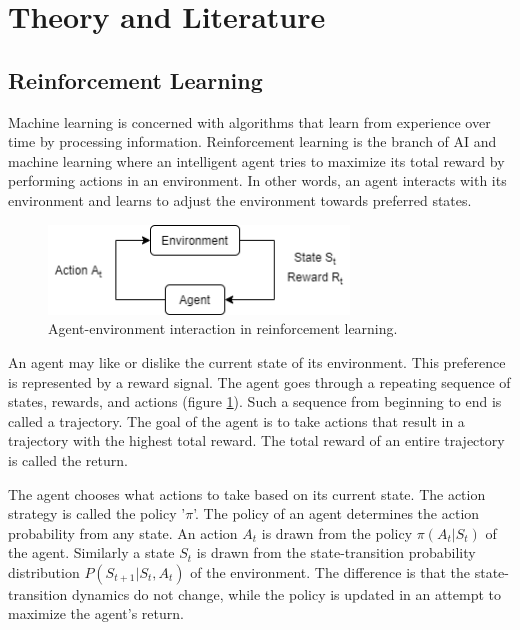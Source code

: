 \section{Theory and Literature}



\subsection{Reinforcement Learning}
Machine learning is concerned with algorithms that learn from experience over time by processing information. Reinforcement learning is the branch of AI and machine learning where an intelligent agent tries to maximize its total reward by performing actions in an environment. In other words, an agent interacts with its environment and learns to adjust the environment towards preferred states. 

\begin{figure}[h]
    \centering
    \includegraphics[width = 8cm]{Figures/RL Diagram.png}
    \caption{\centering Agent-environment interaction in reinforcement learning.}
    \label{fig: RL diagram}
\end{figure}
\noindent
An agent may like or dislike the current state of its environment. This preference is represented by a reward signal. The agent goes through a repeating sequence of states, rewards, and actions (figure \ref{fig: RL diagram}). Such a sequence from beginning to end is called a trajectory. The goal of the agent is to take actions that result in a trajectory with the highest total reward. The total reward of an entire trajectory is called the return. 


The agent chooses what actions to take based on its current state. The action strategy is called the policy '$\pi$'. The policy of an agent determines the action probability from any state. An action $A_t$ is drawn from the policy $\pi(A_t|S_t)$ of the agent. Similarly a state $S_t$ is drawn from the state-transition probability distribution $P(S_{t+1}|S_t,A_t)$ of the environment. The difference is that the state-transition dynamics do not change, while the policy is updated in an attempt to maximize the agent's return.





